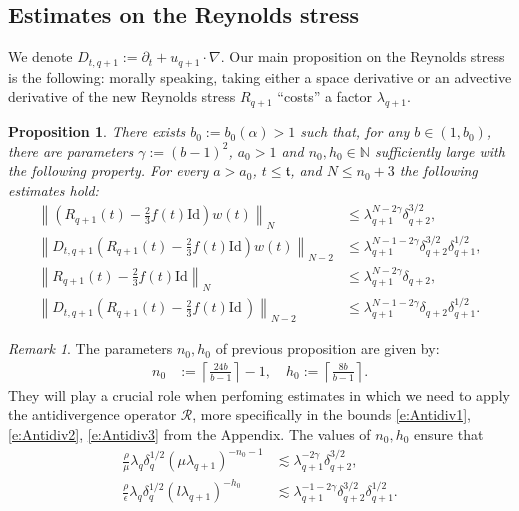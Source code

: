\documentclass[10pt,a4paper]{amsart}
\numberwithin{equation}{section}
\numberwithin{corollario}{section}
\numberwithin{lemma}{section}
\newtheorem{prop}{Proposition}
\numberwithin{prop}{section}
\theoremstyle{definition}
\theoremstyle{remark}
\newtheorem{oss}[thm]{Remark}
\newcommand{\N}{\mathbb{N}}
\newcommand{\Id}{\mathrm{Id}}
\newcommand{\qq}{_{q+1}}
\newcommand{\qqq}{_{q+2}}
\begin{document}
\subsection{Estimates on the Reynolds stress}
\label{ssec:estimatesR}
We denote $D_{t,q+1} := \partial_t +u\qq \cdot \nabla$. Our main proposition on the Reynolds stress is the following: morally speaking, taking either a space derivative or an advective derivative of the new Reynolds stress $R\qq$ ``costs'' a factor $\lambda\qq$.

\begin{prop}\label{prop:R}
There exists $ b_0:=b_0(\alpha)>1$ such that, for any $b\in (1,b_0)$, there are parameters $\gamma:=(b-1)^2$,  $a_0>1$ and $n_0,h_0\in \N$ sufficiently large with the following property. 
For every $a>a_0$, $t\le \mathfrak{t}$, and $N\le n_0+3$ the following estimates hold:
    \begin{align}
        \left\|\left(R\qq(t)-\frac23f(t)\Id\right)w(t) \right\|_N&\label{est:Rw1}
        \le 
        \lambda\qq ^{N-2\gamma}\delta_{q+2}^{3/2},
        \\
        \left\|D_{t,q+1}\left(R\qq(t)-\frac23f(t)\Id \right)w(t)\right\|_{N-2}&\label{est:Rw2}
        \le 
        \lambda\qq ^{N-1-2\gamma}\delta_{q+2}^{3/2}\delta\qq^{1/2},
        \\
    \left\|R\qq(t)-\frac23f(t)\Id\right\|_N&\label{est:R1}
    \le 
    \lambda\qq ^{N-2\gamma}\delta_{q+2},\\
        \left\|D_{t,q+1}\left(R\qq(t)-\frac23f(t)\Id\,\right)\right\|_{N-2}&\label{est:R2}
        \le 
        \lambda\qq ^{N-1-2\gamma}\delta_{q+2}\delta\qq^{1/2}.
\end{align}
\end{prop}

\begin{oss}
The parameters $n_0,h_0$ of previous proposition are given by: 
\begin{align}
    n_0&:=\left\lceil\frac{24b}{b-1}\right\rceil-1,
    \quad
    h_0:=\left\lceil \frac{8b}{b-1}\right\rceil.
\end{align}
They will play a crucial role when perfoming estimates in which we need to apply the antidivergence operator $\mathcal{R}$, more specifically in the bounds \eqref{e:Antidiv1}, \eqref{e:Antidiv2}, \eqref{e:Antidiv3} from the Appendix.
The values of $n_0,h_0$ ensure that
\begin{align}\label{est:n0h0}
    \frac{\rho}{\mu}\lambda_q\delta_q^{1/2}(\mu\lambda\qq)^{-n_0-1}
    &\lesssim \lambda\qq^{-2\gamma}\delta\qqq^{3/2},
    \\
\frac{\rho}{\epsilon}\lambda_q\delta_q^{1/2}(l\lambda\qq)^{-h_0} 
&\lesssim 
\lambda\qq^{-1-2\gamma}\delta\qqq^{3/2}\delta\qq^{1/2}.
\end{align}
\end{oss}
\end{document}
